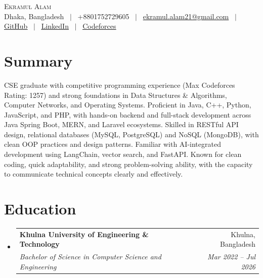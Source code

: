 \documentclass[letterpaper,10.5pt]{article}
\makeatletter
\newcommand{\resumeSubheading}[4]{
  \vspace{-2pt}\item
    \begin{tabular*}{\textwidth}[t]{l@{\extracolsep{\fill}}r}
      \textbf{#1} & #2 \\
      \textit{\small#3} & \textit{\small #4} \\
    \end{tabular*}\vspace{-7pt}
}
\newcommand{\resumeSubHeadingListStart}{\begin{itemize}[leftmargin=0.0in, label={}]}
\newcommand{\resumeSubHeadingListEnd}{\end{itemize}}
\makeatother
\begin{document}
\begin{center}
    {\Huge \scshape Ekramul Alam} \\ \vspace{4pt}
    \small Dhaka, Bangladesh ~$|$~ +8801752729605 ~$|$~
    \href{mailto:ekramul.alam21@gmail.com}{ekramul.alam21@gmail.com} ~$|$~
    \href{https://github.com/Apn7}{\underline{GitHub}} ~$|$~
    \href{https://www.linkedin.com/in/ekramul-alam-525659255/}{\underline{LinkedIn}} ~$|$~
    \href{https://codeforces.com/profile/Apn7}{\underline{Codeforces}}
    \vspace{-6pt}
\end{center}

\section{Summary}
\small{CSE graduate with competitive programming experience (Max Codeforces Rating: 1257) and strong foundations in Data Structures \& Algorithms, Computer Networks, and Operating Systems. Proficient in Java, C++, Python, JavaScript, and PHP, with hands-on backend and full-stack development across Java Spring Boot, MERN, and Laravel ecosystems. Skilled in RESTful API design, relational databases (MySQL, PostgreSQL) and NoSQL (MongoDB), with clean OOP practices and design patterns. Familiar with AI-integrated development using LangChain, vector search, and FastAPI. Known for clean coding, quick adaptability, and strong problem-solving ability, with the capacity to communicate technical concepts clearly and effectively.}
\vspace{-4pt}

\section{Education}
  \resumeSubHeadingListStart
    \resumeSubheading
      {Khulna University of Engineering \& Technology}{Khulna, Bangladesh}
      {Bachelor of Science in Computer Science and Engineering}{Mar 2022 -- Jul 2026}
  \resumeSubHeadingListEnd
\vspace{-6pt}

\end{document}
